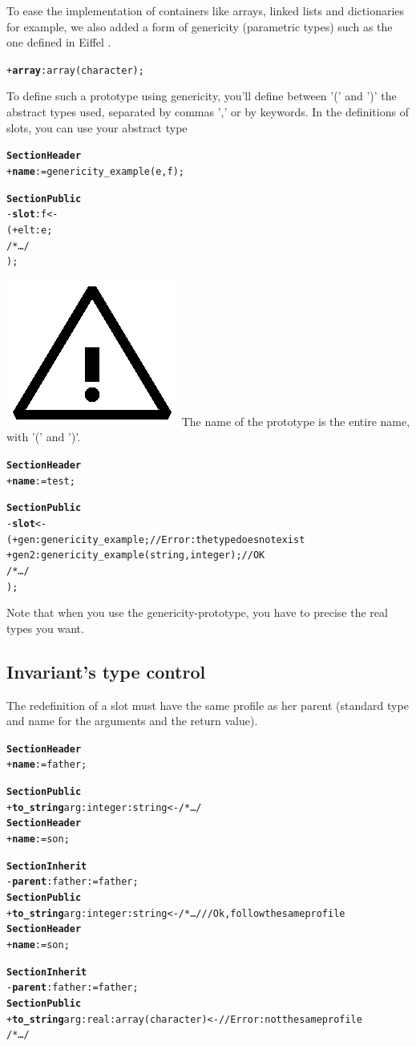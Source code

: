\documentclass[11pt]{mybook}
\newcommand{\warning}{\includegraphics[scale=0.3]{figures/warning}}
\begin{document}
To ease the implementation of containers like arrays, linked
lists and dictionaries for example, we also added a form of genericity
(parametric types) such as the one defined in Eiffel \cite{meyer94a}.
\begin{alltt}
  + {\bf{}array}:{\sc{}array}({\sc{}character});
\end{alltt}
To define such a prototype using genericity, you'll define between '(' and ')' the abstract types used, 
separated by commas ',' or by keywords. In the definitions of slots, you can use your abstract type
\begin{alltt}
{\bf{}Section Header}
  + {\bf{}name} := {\sc{}genericity\_example}({\sc{}e},{\sc{}f});

{\bf{}Section Public}
  - {\bf{}slot}:{\sc{}f} <-
  ( + elt:{\sc{}e};
    /* \ldots */
  );
\end{alltt}
\warning{} The name of the prototype is the entire name, with '(' and ')'.
\begin{alltt}
{\bf{}Section Header}
  + {\bf{}name} := {\sc{}test};

{\bf{}Section Public}
  - {\bf{}slot} <-
  ( + gen:{\sc{}genericity\_example};     // Error: the type does not exist
    + gen2:{\sc{}genericity\_example}({\sc{}string},{\sc{}integer});  // OK
    /* \ldots */
  );
\end{alltt}
Note that when you use the genericity-prototype, you have to precise the real types you want.


\subsection{Invariant's type control}
\label{language_reference:type_names:invariant}
The redefinition of a slot must have the same profile as her
parent (standard type and name for the arguments and the return value).

\begin{alltt}
{\bf{}Section Header}
  + {\bf{}name} := {\sc{}father};

{\bf{}Section Public}
  + {\bf{}to\_string} arg:{\sc{}integer} :{\sc{}string} <- /* \ldots */\\

{\bf{}Section Header}
  + {\bf{}name} := {\sc{}son};

 {\bf{}Section Inherit}
  - {\bf{}parent}: {\sc{}father}:= {\sc{}father};
{\bf{}Section Public}
  + {\bf{}to\_string} arg:{\sc{}integer} :{\sc{}string} <- /* \ldots */ // Ok, follow the same profile\\

{\bf{}Section Header}
  + {\bf{}name} := {\sc{}son};

{\bf{}Section Inherit}
  - {\bf{}parent}:{\sc{}father} := {\sc{}father};
{\bf{}Section Public}
  + {\bf{}to\_string} arg:{\sc{}real} :{\sc{}array(character)} <- // Error: not the same profile
  /* \ldots */ 
\end{alltt}
\end{document}
